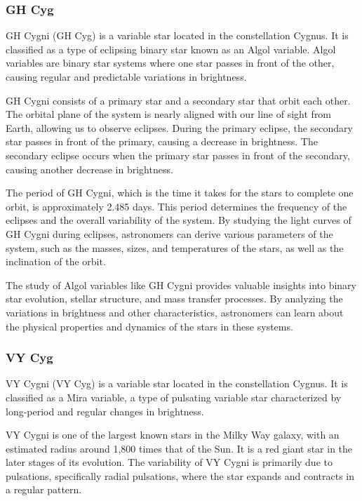\subsubsection*{ GH Cyg }
GH Cygni (GH Cyg) is a variable star located in the constellation Cygnus. It is classified as a type of eclipsing binary star known as an Algol variable. Algol variables are binary star systems where one star passes in front of the other, causing regular and predictable variations in brightness.

GH Cygni consists of a primary star and a secondary star that orbit each other. The orbital plane of the system is nearly aligned with our line of sight from Earth, allowing us to observe eclipses. During the primary eclipse, the secondary star passes in front of the primary, causing a decrease in brightness. The secondary eclipse occurs when the primary star passes in front of the secondary, causing another decrease in brightness.

The period of GH Cygni, which is the time it takes for the stars to complete one orbit, is approximately 2.485 days. This period determines the frequency of the eclipses and the overall variability of the system. By studying the light curves of GH Cygni during eclipses, astronomers can derive various parameters of the system, such as the masses, sizes, and temperatures of the stars, as well as the inclination of the orbit.

The study of Algol variables like GH Cygni provides valuable insights into binary star evolution, stellar structure, and mass transfer processes. By analyzing the variations in brightness and other characteristics, astronomers can learn about the physical properties and dynamics of the stars in these systems.

\subsubsection*{ VY Cyg }
VY Cygni (VY Cyg) is a variable star located in the constellation Cygnus. It is classified as a Mira variable, a type of pulsating variable star characterized by long-period and regular changes in brightness.

VY Cygni is one of the largest known stars in the Milky Way galaxy, with an estimated radius around 1,800 times that of the Sun. It is a red giant star in the later stages of its evolution. The variability of VY Cygni is primarily due to pulsations, specifically radial pulsations, where the star expands and contracts in a regular pattern.

